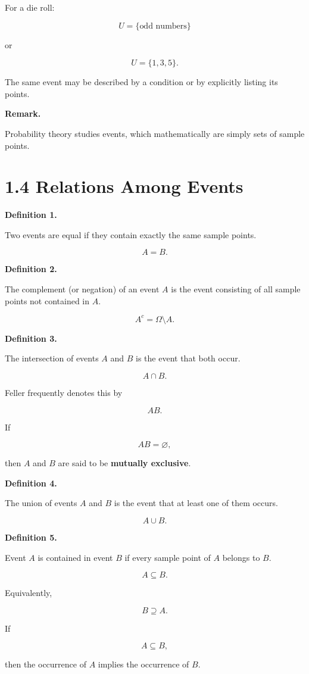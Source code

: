 \documentclass[12pt]{article}
\begin{document}
For a die roll:

\[
U=\{\text{odd numbers}\}
\]

or

\[
U=\{1,3,5\}.
\]

The same event may be described by a condition or by explicitly listing its points.

\textbf{Remark.}

Probability theory studies events, which mathematically are simply sets of sample points.

\section*{1.4 Relations Among Events}

\textbf{Definition 1.}

Two events are equal if they contain exactly the same sample points.

\[
A=B.
\]

\textbf{Definition 2.}

The complement (or negation) of an event \(A\) is the event consisting of all sample points not contained in \(A\).

\[
A^c=\Omega\setminus A.
\]

\textbf{Definition 3.}

The intersection of events \(A\) and \(B\) is the event that both occur.

\[
A\cap B.
\]

Feller frequently denotes this by

\[
AB.
\]

If

\[
AB=\varnothing,
\]

then \(A\) and \(B\) are said to be \textbf{mutually exclusive}.

\textbf{Definition 4.}

The union of events \(A\) and \(B\) is the event that at least one of them occurs.

\[
A\cup B.
\]

\textbf{Definition 5.}

Event \(A\) is contained in event \(B\) if every sample point of \(A\) belongs to \(B\).

\[
A\subseteq B.
\]

Equivalently,

\[
B\supseteq A.
\]

If

\[
A\subseteq B,
\]

then the occurrence of \(A\) implies the occurrence of \(B\).
\end{document}
